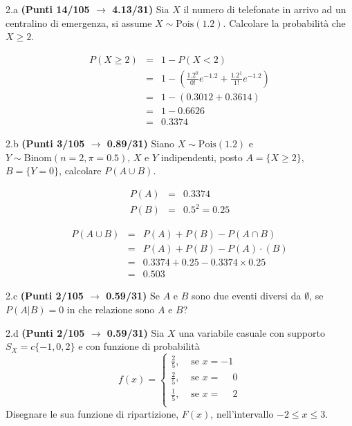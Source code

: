 \documentclass[
  11pt,
]{book}
\theoremstyle{mytheoremstyle}
\theoremstyle{mydefstyle}
\newenvironment{sol}
  {
  \begin{tcolorbox}[enhanced,breakable,arc=0.1mm,boxrule=1pt,colback=white,colframe=iblue,
  title=\bf \fontfamily{lmss}\selectfont \hspace{.5 cm} Soluzione,drop fuzzy shadow]

}{
\end{tcolorbox}
  }
\begin{document}
2.a \textbf{(Punti 14/105 \(\rightarrow\) 4.13/31)} Sia \(X\) il numero di telefonate in arrivo ad un centralino di emergenza, si assume \(X\sim\text{Pois}(1.2)\). Calcolare la probabilità che \(X\geq 2\).

\begin{sol}
\begin{eqnarray*}
   P( X \geq 2 ) &=& 1-P( X < 2 ) \\                 &=& 1-\left( \frac{ 1.2 ^{ 0 }}{ 0 !}e^{- 1.2 }+\frac{ 1.2 ^{ 1 }}{ 1 !}e^{- 1.2 } \right)\\                 &=& 1-( 0.3012+0.3614 )\\                 &=& 1- 0.6626 \\                 &=&   0.3374 
\end{eqnarray*}

\end{sol}

2.b \textbf{(Punti 3/105 \(\rightarrow\) 0.89/31)} Siano \(X\sim\text{Pois}(1.2)\) e \(Y\sim\text{Binom}(n=2,\pi=0.5)\), \(X\) e \(Y\) indipendenti, posto \(A=\{X\geq 2\}\), \(B=\{Y=0\}\), calcolare \(P(A\cup B)\).

\begin{sol}
\begin{eqnarray*}
  P(A) &=&  0.3374\\
  P(B) &=& 0.5^2 = 0.25
\end{eqnarray*}

\begin{eqnarray}
      P( A \cup B ) &=& P( A )+P( B )-P( A \cap B ) \\
                         &=& P( A )+P( B )-P( A )\cdot ( B ) \\
                         &=&  0.3374 + 0.25 - 0.3374 \times 0.25  \\
                         &=&  0.503 \end{eqnarray}

\end{sol}

2.c \textbf{(Punti 2/105 \(\rightarrow\) 0.59/31)} Se \(A\) e \(B\) sono due eventi diversi da \(\emptyset\), se
\(P(A|B)=0\) in che relazione sono \(A\) e \(B\)?

2.d \textbf{(Punti 2/105 \(\rightarrow\) 0.59/31)} Sia \(X\) una variabile casuale con supporto \(S_X=c\{-1,0,2\}\) e con funzione di probabilità
\[
f(x)=\begin{cases}
\frac 25, &\text{ se $x=-1$}\\
\frac 25, &\text{ se $x=\phantom{-} 0$}\\
\frac 15, &\text{ se $x=\phantom{-} 2$}\\
\end{cases}
\]
Disegnare le sua funzione di ripartizione, \(F(x)\), nell'intervallo \(-2\leq x\leq 3\).
\end{document}
